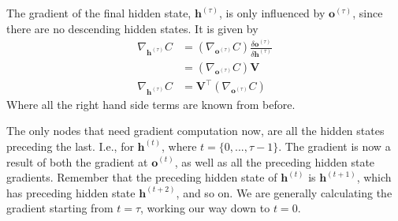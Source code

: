 \documentclass[12pt]{article}
\begin{document}
The gradient of the final hidden state, $\mathbf{h}^{(\tau)}$, is only influenced by $\mathbf{o}^{(\tau)}$, since there are no descending hidden states. It is given by
\begin{align}
    \nabla_{\mathbf{h}^{(\tau)}} C &= \left(\nabla_{\mathbf{o}^{(\tau)}}C\right) \frac{\delta \mathbf{o}^{(\tau)}}{\delta \mathbf{h}^{(\tau)}}\\
    &= \left(\nabla_{\mathbf{o}^{(\tau)}}C\right) \mathbf{V}\\
    \nabla_{\mathbf{h}^{(\tau)}} C &= \mathbf{V}^{\top} \left(\nabla_{\mathbf{o}^{(\tau)}}C\right)
\end{align}
Where all the right hand side terms are known from before. \par

The only nodes that need gradient computation now, are all the hidden states preceding the last. I.e., for $\mathbf{h}^{(t)}$, where $t = \{0,...,\tau-1\}$. The gradient is now a result of both the gradient at $\mathbf{o}^{(t)}$, as well as all the preceding hidden state gradients. Remember that the preceding hidden state of $\mathbf{h}^{(t)}$ is $\mathbf{h}^{(t+1)}$, which has preceding hidden state $\mathbf{h}^{(t+2)}$, and so on. We are generally calculating the gradient starting from $t=\tau$, working our way down to $t=0$. \par
\end{document}
